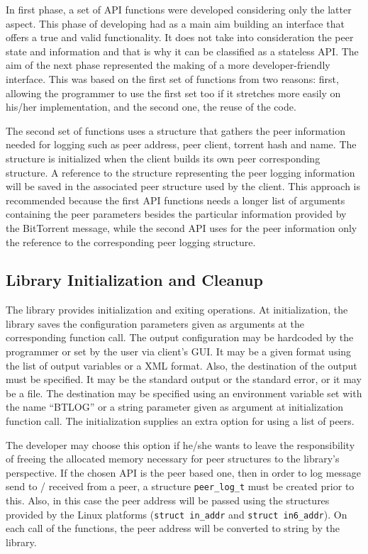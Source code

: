 In first phase, a set of API functions were developed considering only the
latter aspect. This phase of developing had as a main aim building an
interface that offers a true and valid functionality. It does not take into
consideration the peer state and information and that is why it can be
classified as a stateless API. The aim of the next phase represented the
making of a more developer-friendly interface. This was based on the first set
of functions from two reasons: first, allowing the programmer to use the first
set too if it stretches more easily on his/her implementation, and the second
one, the reuse of the code.

The second set of functions uses a structure that gathers the peer information
needed for logging such as peer address, peer client, torrent hash and name.
The structure is initialized when the client builds its own peer corresponding
structure. A reference to the structure representing the peer logging
information will be saved in the associated peer structure used by the client.
This approach is recommended because the first API functions needs a longer
list of arguments containing the peer parameters besides the particular
information provided by the BitTorrent message, while the second API uses for
the peer information only the reference to the corresponding peer logging
structure.

\subsection{Library Initialization and Cleanup}

The library provides initialization and exiting operations. At initialization,
the library saves the configuration parameters given as arguments at the
corresponding function call. The output configuration may be hardcoded by the
programmer or set by the user via client's GUI. It may be a given format using
the list of output variables or a XML format. Also, the destination of the
output must be specified. It may be the standard output or the standard error,
or it may be a file. The destination may be specified using an environment
variable set with the name ``BTLOG'' or a string parameter given as argument at
initialization function call. The initialization supplies an extra option for
using a list of peers.

The developer may choose this option if he/she wants to leave the
responsibility of freeing the allocated memory necessary for peer structures
to the library's perspective. If the chosen API is the peer based one, then in
order to log message send to / received from  a peer, a structure
\texttt{peer\_log\_t} must be created prior to this. Also, in this case the
peer address will be passed using the structures provided by the Linux
platforms (\texttt{struct in\_addr} and \texttt{struct in6\_addr}). On each
call of the functions, the peer address will be converted to string by the
library.

